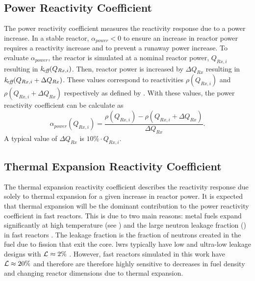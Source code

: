   \subsection{Power Reactivity Coefficient}
  \label{sec:power_reactivity_coefficient}
    The power reactivity coefficient measures the reactivity response due to a 
    power increase. In a stable reactor, $\alpha_{power} < 0$ to ensure an 
    increase in reactor power requires a reactivity increase and to prevent a 
    runaway power increase. To evaluate $\alpha_{power}$, the reactor is
    simulated at a nominal reactor power, $Q_{Rx,i}$ resulting in
    $k_{\!\mbox{\scriptsize \em eff}}(Q_{Rx,i})$. Then, reactor power is increased by $\Delta Q_{Rx}$
    resulting in $k_{\!\mbox{\scriptsize \em eff}}(Q_{Rx,i} + \Delta Q_{Rx})$. These \keff values 
    correspond to reactivities $\rho(Q_{Rx,i})$ and 
    ${\rho(Q_{Rx,i} + \Delta Q_{Rx})}$ respectively as defined by 
    . With these values, the power reactivity coefficient 
    can be calculate as
    \begin{equation}
      \label{eq:power_reactivity_coefficient}
      \alpha_{power}(Q_{Rx,i}) = \frac{\rho(Q_{Rx,i}) - \rho(Q_{Rx,i} + 
        \Delta Q_{Rx})} {\Delta Q_{Rx}}.
    \end{equation}
    A typical value of $\Delta Q_{Rx}$ is $10\% \cdot Q_{Rx,i}$.

  \subsection{Thermal Expansion Reactivity Coefficient}
  \label{sec:thermal_expansion_reactivity_coefficent}
    The thermal expansion reactivity coefficient describes the reactivity 
    response due solely to thermal expansion for a given increase in reactor 
    power. It is expected that thermal expansion will be the dominant 
    contribution to the power reactivity coefficient in fast reactors. This is 
    due to two main reasons: metal fuels expand significantly at high 
    temperature (see ) and the large neutron leakage 
    fraction (\leakage) in fast reactors \cite{PlentifulEnergy}. The leakage 
    fraction is the fraction of neutrons created in the fuel due to fission that 
    exit the core. \glspl{lwr} typically have low and ultra-low 
    leakage designs with $\mathcal{L} \approx 2 \%$ \cite{textbookknief}. However,
    fast reactors simulated in this work have $\mathcal{L} \approx 20\%$ and 
    therefore are therefore highly sensitive to decreases in fuel density and 
    changing reactor dimensions due to thermal expansion.

